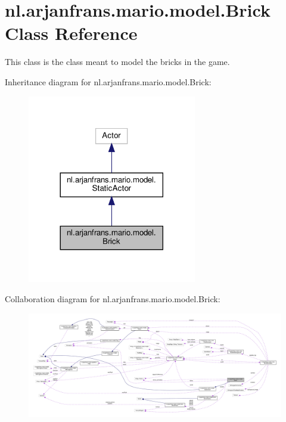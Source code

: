 \hypertarget{classnl_1_1arjanfrans_1_1mario_1_1model_1_1Brick}{}\section{nl.\+arjanfrans.\+mario.\+model.\+Brick Class Reference}
\label{classnl_1_1arjanfrans_1_1mario_1_1model_1_1Brick}


This class is the class meant to model the bricks in the game.  




Inheritance diagram for nl.\+arjanfrans.\+mario.\+model.\+Brick\+:\nopagebreak
\begin{figure}[H]
\begin{center}
\leavevmode
\includegraphics[width=209pt]{classnl_1_1arjanfrans_1_1mario_1_1model_1_1Brick__inherit__graph}
\end{center}
\end{figure}


Collaboration diagram for nl.\+arjanfrans.\+mario.\+model.\+Brick\+:
\nopagebreak
\begin{figure}[H]
\begin{center}
\leavevmode
\includegraphics[width=350pt]{classnl_1_1arjanfrans_1_1mario_1_1model_1_1Brick__coll__graph}
\end{center}
\end{figure}
